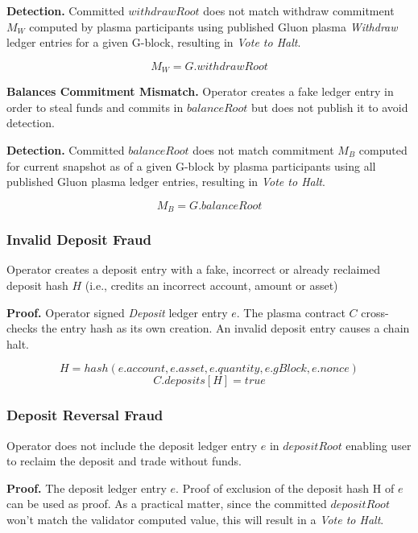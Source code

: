 \documentclass[12pt,a4paper]{article}
\begin{document}
\textbf{Detection.} 
Committed $withdrawRoot$ does not match withdraw commitment $M_W$ computed by plasma participants using published Gluon plasma \emph{Withdraw} ledger entries for a given G-block, resulting in \emph{Vote to Halt}.

\begin{equation}
M_W = G.withdrawRoot
\end{equation}

\textbf{Balances Commitment Mismatch.} Operator creates a fake ledger entry in order to steal funds and commits in $balanceRoot$ but does not publish it to avoid detection.

\textbf{Detection.} Committed $balanceRoot$ does not match commitment $M_B$ computed for current snapshot as of a given G-block by plasma participants using all published Gluon plasma ledger entries, resulting in \emph{Vote to Halt}.

\begin{equation}
M_B = G.balanceRoot
\end{equation}

\subsubsection{Invalid Deposit Fraud}\label{fp:idf}
Operator creates a deposit entry with a fake, incorrect or already reclaimed deposit hash $H$ (i.e., credits an incorrect account, amount or asset) 

\textbf{Proof.} 
Operator signed \emph{Deposit} ledger entry $e$. The plasma contract $C$ cross-checks the entry hash as its own creation. An invalid deposit entry causes a chain halt.

    \[ H = hash(e.account, e.asset, e.quantity, e.gBlock, e.nonce) \]
    \begin{equation}
    C.deposits[H] = true
    \end{equation}


\subsubsection{Deposit Reversal Fraud}\label{fp:drf}
Operator does not include the deposit ledger entry $e$ in $depositRoot$ enabling user to reclaim the deposit and trade without funds. 

\textbf{Proof.} The deposit ledger entry $e$. Proof of exclusion of the deposit hash H of $e$ can be used as proof. As a practical matter, since the committed $depositRoot$ won't match the validator computed value, this will result in a \emph{Vote to Halt}.
\end{document}
